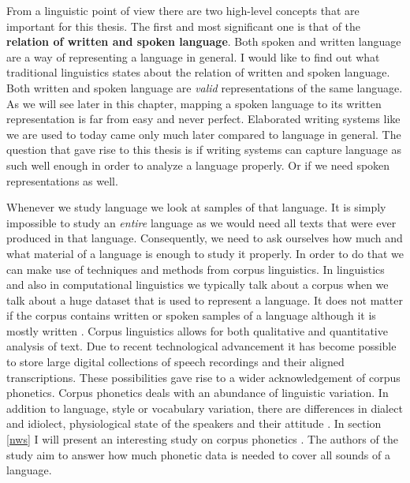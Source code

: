 \label{chap:ling-background}

From a linguistic point of view there are two high-level concepts that are important for this thesis. The first and most significant one is that of the \textbf{relation of written and spoken language}. Both spoken and written language are a way of representing a language in general. I would like to find out what traditional linguistics states about the relation of written and spoken language. Both written and spoken language are \textit{valid} representations of the same language. As we will see later in this chapter, mapping a spoken language to its written representation is far from easy and never perfect. Elaborated writing systems like we are used to today came only much later compared to language in general\citep{Hock&Joseph.2019}. The question that gave rise to this thesis is if writing systems can capture language as such well enough in order to analyze a language properly. Or if we need spoken representations as well. 

Whenever we study language we look at samples of that language. It is simply impossible to study an \textit{entire} language as we would need all texts that were ever produced in that language. Consequently, we need to ask ourselves how much and what material of a language is enough to study it properly. In order to do that we can make use of techniques and methods from corpus linguistics. In linguistics and also in computational linguistics we typically talk about a corpus when we talk about a huge dataset that is used to represent a language. It does not matter if the corpus contains written or spoken samples of a language although it is mostly written \citep{McEnery&Hardie.2011}. Corpus linguistics allows for both qualitative and quantitative analysis of text. Due to recent technological advancement it has become possible to store large digital collections of speech recordings and their aligned transcriptions. These possibilities gave rise to a wider acknowledgement of corpus phonetics. Corpus phonetics deals with an abundance of linguistic variation. In addition to language, style or vocabulary variation, there are differences in dialect and idiolect, physiological state of the speakers and their attitude \citep{Liberman.2019, Chodroff.19.07.2019}. In section \ref{nws} I will present an interesting study on corpus phonetics \citep{baird_evans_greenhill_2021}. The authors of the study aim to answer how much phonetic data is needed to cover all sounds of a language.

